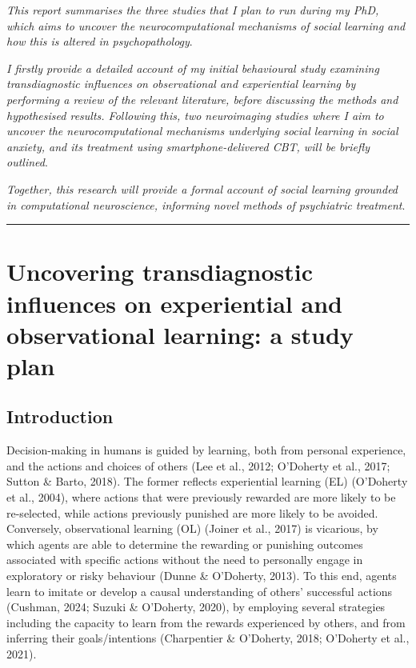 \documentclass[12pt,a4paper,oneside,]{book} %
\begin{document}
\emph{This report summarises the three studies that I plan to run during my PhD, which aims to uncover the neurocomputational mechanisms of social learning and how this is altered in psychopathology}.

\emph{I firstly provide a detailed account of my initial behavioural study examining transdiagnostic influences on observational and experiential learning by performing a review of the relevant literature, before discussing the methods and hypothesised results. Following this, two neuroimaging studies where I aim to uncover the neurocomputational mechanisms underlying social learning in social anxiety, and its treatment using smartphone-delivered CBT, will be briefly outlined}.

\emph{Together, this research will provide a formal account of social learning grounded in computational neuroscience, informing novel methods of psychiatric treatment}.

\begin{center}\rule{0.5\linewidth}{0.5pt}\end{center}

\chapter{Uncovering transdiagnostic influences on experiential and observational learning: a study plan}\label{uncovering-transdiagnostic-influences-on-experiential-and-observational-learning-a-study-plan}

\chaptermark{}

\section{Introduction}\label{introduction-1}

Decision-making in humans is guided by learning, both from personal experience, and the actions and choices of others (Lee et al., 2012; O'Doherty et al., 2017; Sutton \& Barto, 2018). The former reflects experiential learning (EL) (O'Doherty et al., 2004), where actions that were previously rewarded are more likely to be re-selected, while actions previously punished are more likely to be avoided. Conversely, observational learning (OL) (Joiner et al., 2017) is vicarious, by which agents are able to determine the rewarding or punishing outcomes associated with specific actions without the need to personally engage in exploratory or risky behaviour (Dunne \& O'Doherty, 2013). To this end, agents learn to imitate or develop a causal understanding of others' successful actions (Cushman, 2024; Suzuki \& O'Doherty, 2020), by employing several strategies including the capacity to learn from the rewards experienced by others, and from inferring their goals/intentions (Charpentier \& O'Doherty, 2018; O'Doherty et al., 2021).
\end{document}
